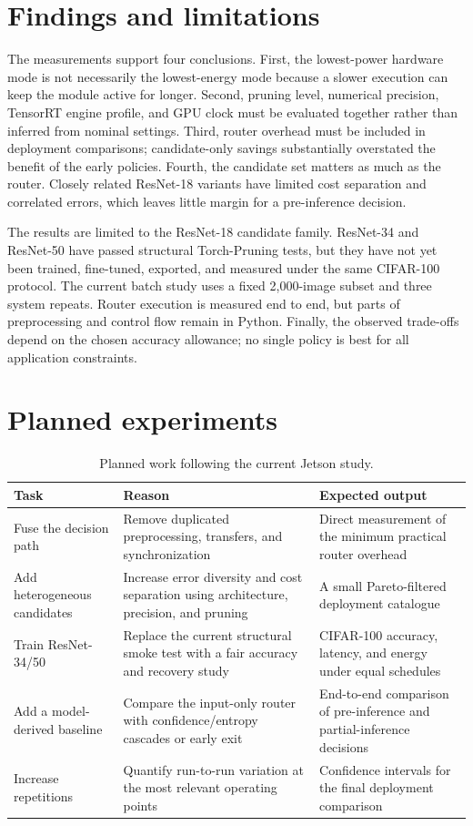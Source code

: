 \documentclass[11pt,a4paper]{article}
\begin{document}
\section{Findings and limitations}

The measurements support four conclusions. First, the lowest-power hardware mode is not necessarily the lowest-energy mode because a slower execution can keep the module active for longer. Second, pruning level, numerical precision, TensorRT engine profile, and GPU clock must be evaluated together rather than inferred from nominal settings. Third, router overhead must be included in deployment comparisons; candidate-only savings substantially overstated the benefit of the early policies. Fourth, the candidate set matters as much as the router. Closely related ResNet-18 variants have limited cost separation and correlated errors, which leaves little margin for a pre-inference decision.

The results are limited to the ResNet-18 candidate family. ResNet-34 and ResNet-50 have passed structural Torch-Pruning tests, but they have not yet been trained, fine-tuned, exported, and measured under the same CIFAR-100 protocol. The current batch study uses a fixed 2,000-image subset and three system repeats. Router execution is measured end to end, but parts of preprocessing and control flow remain in Python. Finally, the observed trade-offs depend on the chosen accuracy allowance; no single policy is best for all application constraints.

\section{Planned experiments}

\begin{table}[H]
\centering
\small
\caption{Planned work following the current Jetson study.}
\begin{tabularx}{\textwidth}{@{}p{}X X@{}}
\toprule
Task & Reason & Expected output \\
\midrule
Fuse the decision path & Remove duplicated preprocessing, transfers, and synchronization & Direct measurement of the minimum practical router overhead \\
Add heterogeneous candidates & Increase error diversity and cost separation using architecture, precision, and pruning & A small Pareto-filtered deployment catalogue \\
Train ResNet-34/50 & Replace the current structural smoke test with a fair accuracy and recovery study & CIFAR-100 accuracy, latency, and energy under equal schedules \\
Add a model-derived baseline & Compare the input-only router with confidence/entropy cascades or early exit & End-to-end comparison of pre-inference and partial-inference decisions \\
Increase repetitions & Quantify run-to-run variation at the most relevant operating points & Confidence intervals for the final deployment comparison \\
\bottomrule
\end{tabularx}
\end{table}
\end{document}
